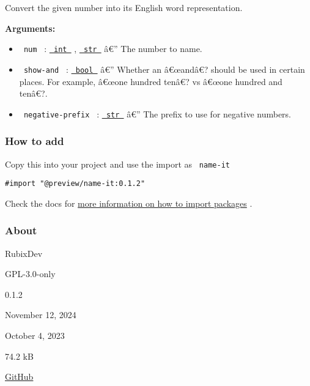 Convert the given number into its English word representation.

\begin{Shaded}
\begin{Highlighting}[]
\end{Highlighting}
\end{Shaded}

\textbf{Arguments:}

\begin{itemize}
\tightlist
\item
  \texttt{\ num\ } :
  \href{https://typst.app/docs/reference/foundations/int/}{\texttt{\ int\ }}
  ,
  \href{https://typst.app/docs/reference/foundations/str/}{\texttt{\ str\ }}
  â€'' The number to name.
\item
  \texttt{\ show-and\ } :
  \href{https://typst.app/docs/reference/foundations/bool/}{\texttt{\ bool\ }}
  â€'' Whether an â€œandâ€? should be used in certain places. For
  example, â€œone hundred tenâ€? vs â€œone hundred and tenâ€?.
\item
  \texttt{\ negative-prefix\ } :
  \href{https://typst.app/docs/reference/foundations/str/}{\texttt{\ str\ }}
  â€'' The prefix to use for negative numbers.
\end{itemize}

\subsubsection{How to add}\label{how-to-add}

Copy this into your project and use the import as \texttt{\ name-it\ }

\begin{verbatim}
#import "@preview/name-it:0.1.2"
\end{verbatim}



Check the docs for
\href{https://typst.app/docs/reference/scripting/\#packages}{more
information on how to import packages} .

\subsubsection{About}\label{about}

\begin{description}
\tightlist
\item[Author :]
RubixDev
\item[License:]
GPL-3.0-only
\item[Current version:]
0.1.2
\item[Last updated:]
November 12, 2024
\item[First released:]
October 4, 2023
\item[Archive size:]
74.2 kB
\href{https://packages.typst.org/preview/name-it-0.1.2.tar.gz}{\pandocbounded{}}
\item[Repository:]
\href{https://github.com/RubixDev/typst-name-it}{GitHub}
\end{description}

